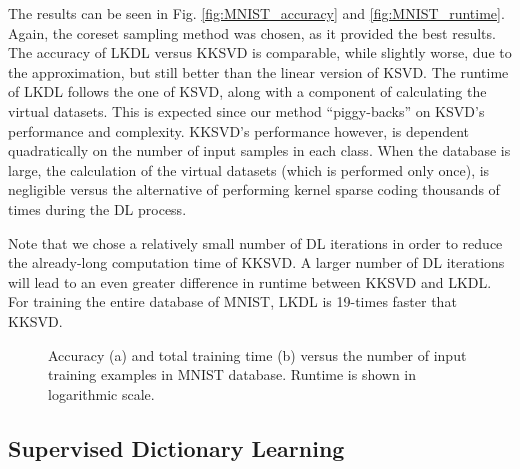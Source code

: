 \documentclass[journal]{IEEEtran}
\newcommand{\bC}{\mathbf{C}}
\begin{document}
The results can be seen in Fig. \ref{fig:MNIST_accuracy} and \ref{fig:MNIST_runtime}. Again, the coreset sampling method was chosen, as it provided the best results. The accuracy of LKDL versus KKSVD is comparable, while slightly worse, due to the approximation, but still better than the linear version of KSVD. The runtime of LKDL follows the one of KSVD, along with a component of calculating the virtual datasets. This is expected since our method ``piggy-backs'' on KSVD's performance and complexity. KKSVD's performance however, is dependent quadratically on the number of input samples in each class. When the database is large, the calculation of the virtual datasets (which is performed only once), is negligible versus the alternative of performing kernel sparse coding thousands of times during the DL process.

Note that we chose a relatively small number of DL iterations in order to reduce the already-long computation time of KKSVD. A larger number of DL iterations will lead to an even greater difference in runtime between KKSVD and LKDL.
For training the entire database of MNIST, LKDL is 19-times faster that KKSVD.


\begin{figure*}[!t]
\centering
{}
\hfil
{}
\caption{Accuracy (a) and total training time (b) versus the number of input training examples in MNIST database. Runtime is shown in logarithmic scale.}
\label{fig:GRAPH_3}
\end{figure*}

\subsection{Supervised Dictionary Learning}\label{SS:Supervised}
\end{document}

